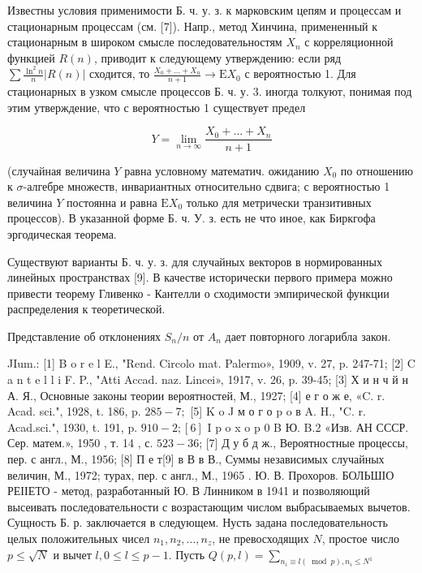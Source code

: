 \documentclass[10pt]{article}
\begin{document}
Известны условия применимости Б. ч. у. з. к марковским цепям и процессам и стационарным процессам (см. [7]). Напр., метод Хинчина, примененный к стационарным в широком смысле последовательностям $X_{n}$ с корреляционной функцией $R(n)$, приводит к следующему утверждению: если ряд $\sum \frac{\ln ^{2} n}{n}|R(n)|$ сходится, то $\frac{X_{0}+\ldots+X_{n}}{n+1} \rightarrow \mathrm{E} X_{0}$ с вероятностью 1. Для стационарных в узком смысле процессов Б. ч. у. 3. иногда толкуют, понимая под этим утверждение, что с вероятностью 1 существует предел



\[

Y=\lim _{n \rightarrow \infty} \frac{X_{0}+\ldots+X_{n}}{n+1}

\]



(случайная величина $Y$ равна условному математич. ожиданию $X_{0}$ по отношению к $\sigma$-алгебре множеств, инвариантных относительно сдвига; с вероятностью 1 величина $Y$ постоянна и равна $\mathrm{E} X_{0}$ только для метрически транзитивных процессов). В указанной форме Б. ч. У. з. есть не что иное, как Биркгофа эргодическая теорема.



Существуют варианты Б. ч. у. з. для случайных векторов в нормированных линейных пространствах [9]. В качестве исторически первого примера можно привести теорему Гливенко - Кантелли о сходимости эмпирической функции распределения к теоретической.



Представление об отклонениях $S_{n} / n$ от $A_{n}$ дает повторного логарибла закон.



JIum.: [1] B o r e l E., "Rend. Circolo mat. Palermo», 1909, v. 27, p. 247-71; [2] C a n t e l l i F. P., "Atti Accad. naz. Lincei», 1917, v. 26, p. 39-45; [3] Х и н ч й н А. Я., Основные законы теории вероятностей, М., 1927; [4] е г о ж е, «C. r. Acad. sci.", 1928, t. 186, p. $285-7 ;$ [5] K o J м о г о p o в A. H., "C. r. Acad.sci.", 1930, t. 191, p. $910-2 ;[6]$ I p o x o p 0 B Ю. B.2 «Изв. АН СССР. Сер. матем.», 1950 , т. 14 , с. $523-36$; [7] Д у б д ж., Вероятностные процессы, пер. с англ., М., 1956; [8] П е т[9] в В в В., Суммы независимых случайных величин, М., 1972; турах, пер. с англ., М., 1965 . Ю. В. Прохоров. БОЛЬШІО РЕІІЕТО - метод, разработанный Ю. В Линником в 1941 и позволяющий высеивать последовательности с возрастающим числом выбрасываемых вычетов. Сущность Б. р. заключается в следующем. Нусть задана последовательность целых положительных чисел $n_{1}, n_{2}, \ldots, n_{z}$, не превосходящих $N$, простое число $p \leqslant \sqrt{N}$ и вычет $l, 0 \leqslant l \leqslant p-1$. Пусть $Q(p, l)=\sum_{n_{i} \equiv l(\bmod p), n_{i} \leqslant N^{1}}$
\end{document}
